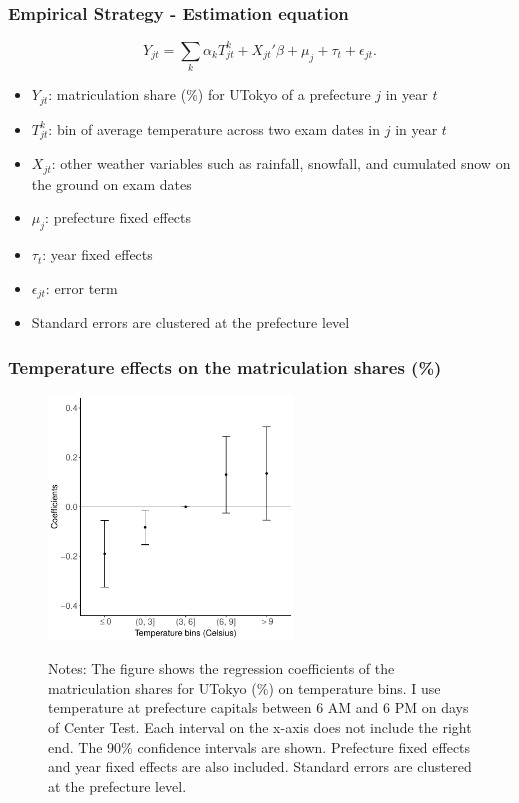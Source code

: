 \documentclass[10pt, pdfmx,hiresbb]{beamer}
\begin{document}
\begin{frame}\frametitle{Empirical Strategy - Estimation equation}
  \label{est_eq}
  \begin{equation*}
    Y_{jt} = \sum_k \alpha_k T_{jt}^k + X_{jt}' \beta + \mu_j + \tau_t + \epsilon_{jt}.
  \end{equation*}
  \begin{itemize}
    \item $Y_{jt}$: matriculation share (\%) for UTokyo of a prefecture $j$ in year $t$
    \item $T_{jt}^k$: bin of average temperature across two exam dates in $j$ in year $t$
    \item $X_{jt}$: other weather variables such as rainfall, snowfall, and cumulated snow on the ground on exam dates
    \item $\mu_j$: prefecture fixed effects
    \item $\tau_t$: year fixed effects
    \item $\epsilon_{jt}$: error term
    \item Standard errors are clustered at the prefecture level 
  \end{itemize}
  \hyperlink{temp_dev_1}{}
  \hyperlink{temp_dev_2}{}
\end{frame}

\begin{frame}\frametitle{Temperature effects on the matriculation shares (\%)}
  \begin{center}
    \begin{figure}
      \includegraphics[width=6.5cm]{../Output/images/main_reg_2.pdf}
      \tiny
      \begin{tablenotes}
      \item Notes:
        The figure shows the regression coefficients of the matriculation shares for UTokyo (\%) on temperature bins.
        I use temperature at prefecture capitals between 6 AM and 6 PM on days of Center Test.
        Each interval on the x-axis does not include the right end.
        The 90\% confidence intervals are shown.
        Prefecture fixed effects and year fixed effects are also included.
        Standard errors are clustered at the prefecture level.
      \end{tablenotes}
    \end{figure}
  \end{center}
\end{frame}
\end{document}
